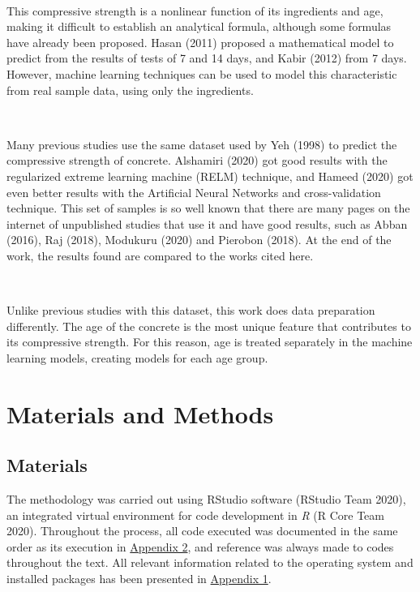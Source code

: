 \documentclass[
]{article}
\begin{document}
~

This compressive strength is a nonlinear function of its ingredients and
age, making it difficult to establish an analytical formula, although
some formulas have already been proposed. Hasan (2011) proposed a
mathematical model to predict from the results of tests of 7 and 14
days, and Kabir (2012) from 7 days. However, machine learning techniques
can be used to model this characteristic from real sample data, using
only the ingredients.

~

Many previous studies use the same dataset used by Yeh (1998) to predict
the compressive strength of concrete. Alshamiri (2020) got good results
with the regularized extreme learning machine (RELM) technique, and
Hameed (2020) got even better results with the Artificial Neural
Networks and cross-validation technique. This set of samples is so well
known that there are many pages on the internet of unpublished studies
that use it and have good results, such as Abban (2016), Raj (2018),
Modukuru (2020) and Pierobon (2018). At the end of the work, the results
found are compared to the works cited here.

~

Unlike previous studies with this dataset, this work does data
preparation differently. The age of the concrete is the most unique
feature that contributes to its compressive strength. For this reason,
age is treated separately in the machine learning models, creating
models for each age group.

\hypertarget{materials-and-methods}{%
\section{Materials and Methods}\label{materials-and-methods}}

\hypertarget{materials}{%
\subsection{Materials}\label{materials}}

The methodology was carried out using RStudio software (RStudio Team
2020), an integrated virtual environment for code development in
\emph{R} (R Core Team 2020). Throughout the process, all code executed
was documented in the same order as its execution in
\protect\hyperlink{appendix2}{Appendix 2}, and reference was always made
to codes throughout the text. All relevant information related to the
operating system and installed packages has been presented in
\protect\hyperlink{appendix1}{Appendix 1}.
\end{document}
